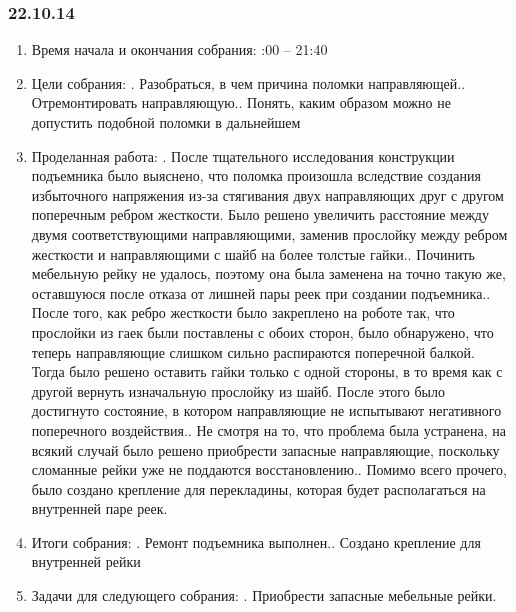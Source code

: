 \documentclass[11pt]{article}
\begin{document}
           \subsubsection{22.10.14}
           \begin{enumerate}
              \item Время начала и окончания собрания:                          
              :00 – 21:40
              \item Цели собрания:
              .   Разобраться, в чем причина поломки направляющей..   Отремонтировать направляющую..   Понять, каким образом можно не допустить подобной поломки в дальнейшем
              
              \item Проделанная работа:
              .   После тщательного исследования конструкции подъемника было выяснено, что поломка произошла вследствие создания избыточного напряжения из-за стягивания двух направляющих друг с другом поперечным ребром жесткости. Было решено увеличить расстояние между двумя соответствующими направляющими, заменив прослойку между ребром жесткости и направляющими с шайб на более толстые гайки..   Починить мебельную рейку не удалось, поэтому она была заменена на точно такую же, оставшуюся после отказа от лишней пары реек при создании подъемника..   После того, как ребро жесткости было закреплено на роботе так, что прослойки из гаек были поставлены с обоих сторон, было обнаружено, что теперь направляющие слишком сильно распираются поперечной балкой. Тогда было решено оставить гайки только с одной стороны, в то время как с другой вернуть изначальную прослойку из шайб. После этого было достигнуто состояние, в котором направляющие не испытывают негативного поперечного воздействия..   Не смотря на то, что проблема была устранена, на всякий случай было решено приобрести запасные направляющие, поскольку сломанные рейки уже не поддаются восстановлению..   Помимо всего прочего, было создано крепление для перекладины, которая будет располагаться на внутренней паре реек.
              
              \item Итоги собрания:
              .   Ремонт подъемника выполнен..   Создано крепление для внутренней рейки   
              \item Задачи для следующего собрания:
              .   Приобрести запасные мебельные рейки.
           \end{enumerate}
           \newpage
\end{document}
